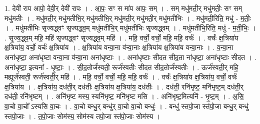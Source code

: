 \documentclass[17pt]{extarticle}
\begin{document}
1. देवी॑ राप आपो॒ देवी॒र् देवी॑ रापः । . आ॒पः॒ सꣳ स मा॑प आपः॒ सम् । . सम् मधु॑मती॒र् मधु॑मतीः॒ सꣳ सम् मधु॑मतीः । . मधु॑मती॒र् मधु॑मतीभि॒र् मधु॑मतीभि॒र् मधु॑मती॒र् मधु॑मती॒र् मधु॑मतीभिः । . मधु॑मती॒रिति॒ मधु॑ - म॒तीः॒ । . मधु॑मतीभिः सृज्यद्ध्वꣳ सृज्यद्ध्व॒म् मधु॑मतीभि॒र् मधु॑मतीभिः सृज्यद्ध्वम् । . मधु॑मतीभि॒रिति॒ मधु॑ - म॒ती॒भिः॒ । . सृ॒ज्य॒द्ध्व॒म् महि॒ महि॑ सृज्यद्ध्वꣳ सृज्यद्ध्व॒म् महि॑ । . महि॒ वर्चो॒ वर्चो॒ महि॒ महि॒ वर्चः॑ । . वर्चः॑ क्ष॒त्रिया॑य क्ष॒त्रिया॑य॒ वर्चो॒ वर्चः॑ क्ष॒त्रिया॑य । . क्ष॒त्रिया॑य वन्वा॒ना व॑न्वा॒नाः क्ष॒त्रिया॑य क्ष॒त्रिया॑य वन्वा॒नाः । . व॒न्वा॒ना अना॑धृष्टा॒ अना॑धृष्टा वन्वा॒ना व॑न्वा॒ना अना॑धृष्टाः । . अना॑धृष्टाः सीदत सीद॒ता ना॑धृष्टा॒ अना॑धृष्टाः सीदत । . अना॑धृष्टा॒ इत्यना᳚ - धृ॒ष्टाः॒ । . सी॒द॒तोर्ज॑स्वती॒ रूर्ज॑स्वतीः सीदत सीद॒तोर्ज॑स्वतीः । . ऊर्ज॑स्वती॒र् महि॒ मह्यूर्ज॑स्वती॒ रूर्ज॑स्वती॒र् महि॑ । . महि॒ वर्चो॒ वर्चो॒ महि॒ महि॒ वर्चः॑ । . वर्चः॑ क्ष॒त्रिया॑य क्ष॒त्रिया॑य॒ वर्चो॒ वर्चः॑ क्ष॒त्रिया॑य । . क्ष॒त्रिया॑य॒ दध॑ती॒र् दध॑तीः क्ष॒त्रिया॑य क्ष॒त्रिया॑य॒ दध॑तीः । . दध॑ती॒ रनि॑भृष्ट॒ मनि॑भृष्ट॒म् दध॑ती॒र् दध॑ती॒ रनि॑भृष्टम् । . अनि॑भृष्ट मस्य॒ स्यनि॑भृष्ट॒ मनि॑भृष्ट मसि । . अनि॑भृष्ट॒मित्यनि॑ - भृ॒ष्ट॒म् । . अ॒सि॒ वा॒चो वा॒चो᳚ ऽस्यसि वा॒चः । . वा॒चो बन्धु॒र् बन्धु॑र् वा॒चो वा॒चो बन्धुः॑ । . बन्धु॑ स्तपो॒जा स्त॑पो॒जा बन्धु॒र् बन्धु॑ स्तपो॒जाः । . त॒पो॒जाः सोम॑स्य॒ सोम॑स्य तपो॒जा स्त॑पो॒जाः सोम॑स्य । \newline
\end{document}
